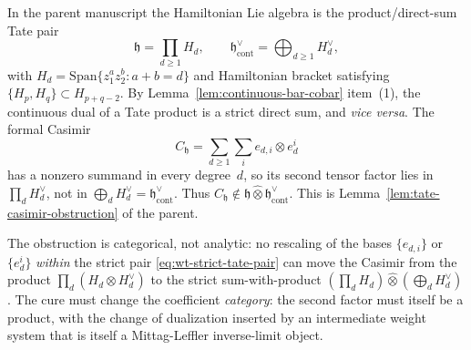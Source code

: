 \begin{rmk}\label{rmk:diagnosis-unweighted-casimir}
  In the parent manuscript the Hamiltonian Lie algebra is the
  product/direct-sum Tate pair
  \begin{equation}\label{eq:wt-strict-tate-pair}
    \mathfrak h=\prod_{d\geq1}H_d,\qquad
    \mathfrak h^\vee_{\mathrm{cont}}=\bigoplus_{d\geq1}H_d^\vee,
  \end{equation}
  with $H_d=\mathrm{Span}\{z_1^az_2^b:a+b=d\}$ and Hamiltonian bracket
  satisfying $\{H_p,H_q\}\subset H_{p+q-2}$. By
  Lemma~\ref{lem:continuous-bar-cobar} item~(1), the continuous dual of
  a Tate product is a strict direct sum, and \emph{vice versa}. The
  formal Casimir
  \begin{equation}\label{eq:wt-casimir-formal}
    C_{\mathfrak h}=\sum_{d\geq1}\sum_i e_{d,i}\otimes e^i_d
  \end{equation}
  has a nonzero summand in every degree~$d$, so its second tensor
  factor lies in $\prod_d H_d^\vee$, not in
  $\bigoplus_d H_d^\vee=\mathfrak h^\vee_{\mathrm{cont}}$. Thus
  $C_{\mathfrak h}\notin\mathfrak h\widehat\otimes
  \mathfrak h^\vee_{\mathrm{cont}}$. This is
  Lemma~\ref{lem:tate-casimir-obstruction} of the parent.

  The obstruction is categorical, not analytic: no rescaling of the
  bases $\{e_{d,i}\}$ or $\{e^i_d\}$ \emph{within} the strict pair
  \eqref{eq:wt-strict-tate-pair} can move the Casimir from the product
  $\prod_d(H_d\otimes H_d^\vee)$ to the strict sum-with-product
  $(\prod_d H_d)\widehat\otimes(\bigoplus_d H_d^\vee)$. The cure must
  change the coefficient \emph{category}: the second factor must
  itself be a product, with the change of dualization inserted by an
  intermediate weight system that is itself a Mittag-Leffler
  inverse-limit object.
\end{rmk}

